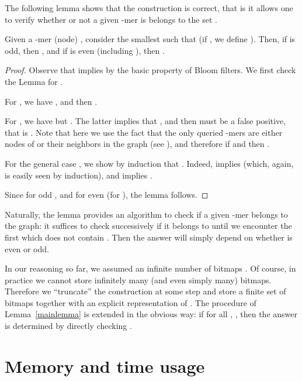 \documentclass[pdftex]{llncs}\usepackage[T1]{fontenc}
\begin{document}
The following lemma shows that the construction is correct, that is it allows one to verify whether or not a given -mer is belongs to the set .

\begin{lemma}
\label{mainlemma}
Given a -mer (node) , consider the smallest  such that  (if , we define ).
Then, if  is odd, then , and if  is even (including ), then .
\end{lemma}
\begin{proof}
Observe that  implies  by the basic property of Bloom filters. We first check the Lemma for .

For ,  we have , and then .

For , we have  but . The latter implies that , and then  must be a false positive, that is .
Note that here we use the fact that the only queried -mers  are either nodes of  or their neighbors in the graph (see \cite{DBLP:conf/wabi/ChikhiR12}), and therefore if  and  then .


For the general case , we show by induction that . Indeed,  implies  (which, again, is easily seen by induction),
and  implies .

Since  for odd , and  for even  (for ), the lemma follows.
\end{proof}

Naturally, the lemma provides an algorithm to check if a given -mer  belongs to the graph: it suffices to check successively if it belongs to  until we encounter the first  which does not contain . Then the answer will simply depend on whether  is even or odd.

In our reasoning so far, we assumed an infinite number of bitmaps .
Of course, in practice we cannot store infinitely many (and even simply many) bitmaps. Therefore we ``truncate'' the construction at some step  and store a finite set of bitmaps  together with an explicit representation of . The procedure of Lemma~\ref{mainlemma} is extended in the obvious way: if for all , , then the answer is determined by directly checking .

\section{Memory and time usage} \label{sec:memory_time}
\end{document}
